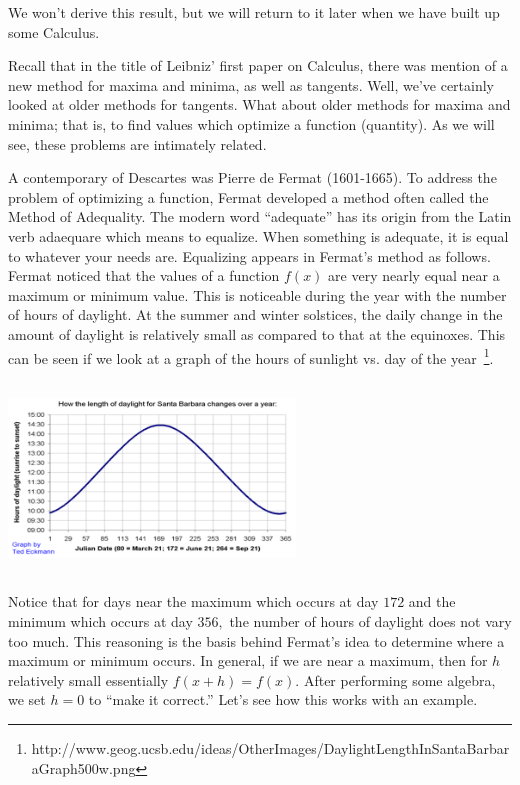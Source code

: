 We won't derive this result, but we will return to it later when we
have built up some Calculus.

Recall that in the title of Leibniz' first paper on Calculus, there was
mention of a new method for maxima and minima, as well as tangents.
Well, we've certainly looked at older methods for tangents.  What
about older methods for maxima and minima; that is, to find values
which optimize a function (quantity).  As we will see, these problems
are intimately related.

A contemporary of 
Descartes was Pierre de Fermat
(1601-1665).  To address the problem of optimizing a function, Fermat
developed a method often called the Method of Adequality.  The modern
word ``adequate'' has its origin from the Latin verb adaequare which
means to equalize.  When something is adequate,  it is
 equal to whatever your needs are.   Equalizing appears
in Fermat's method as follows.  Fermat noticed that the values of a
function $f(x)$ are very nearly equal near a maximum or minimum value.
This is noticeable during the year with the number of hours of
daylight.  At the summer and winter solstices, the daily change in the
amount of daylight is relatively small as compared to that at the
equinoxes.  This can be seen if we look at a graph of
the hours of sunlight vs. day of the year~\footnote{http://www.geog.ucsb.edu/ideas/OtherImages/DaylightLengthInSantaBarbaraGraph500w.png}.

\centerline{\includegraphics*[height=2in,width=3in]{Figures/SantaBarbaraDaylight}}


Notice that for days near the maximum which occurs at day $172$ and
the minimum which occurs at day $356,$ the number of hours of daylight
does not vary too much.  This reasoning is the basis behind Fermat's
idea to determine where a maximum or minimum occurs.  In general, if we
are near a maximum, then for $h$ relatively small essentially $f(x+h)=f(x).$ After
performing some algebra, we set $h=0$ to ``make it correct.''  Let's
see how this works with an example.

